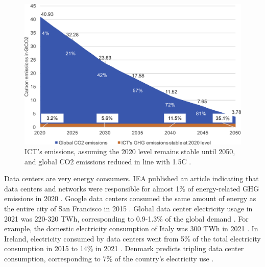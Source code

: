 \begin{figure}[!htb]
    \centering
    \includegraphics[scale=0.8]{Images/Related_works/gr6_lrg.jpg}
    \caption[ICT's emissions, assuming the 2020 level remains stable until 2050, and global CO2 emissions reduced in line with 1.5\degree C.]{ICT's emissions, assuming the 2020 level remains stable until 2050, and global CO2 emissions reduced in line with 1.5\degree C \cite{freitag2021climate}.}
    \label{fig:stable_emissions_ICT}
\end{figure}


Data centers are very energy consumers. IEA published an article indicating that data centers and networks were responsible for almost 1\% of energy-related GHG emissions in 2020 \cite{centres2022data}. Google data centers consumed the same amount of energy as the entire city of San Francisco in 2015 \cite{khan2018exploiting}. Global data center electricity usage in 2021 was 220-320 TWh, corresponding to 0.9-1.3\% of the global demand \cite{centres2022data}. For example, the domestic electricity consumption of Italy was 300 TWh in 2021 \cite{ElectricityDomesticConsumption}. In Ireland, electricity consumed by data centers went from 5\% of the total electricity consumption in 2015 to 14\% in 2021 \cite{IrelandDatacenter}. Denmark predicts tripling data center consumption, corresponding to 7\% of the country’s electricity use \cite{DenmarkDatacenter}.

